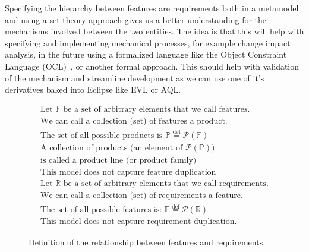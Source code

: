 Specifying the hierarchy between features are requirements both in a metamodel and using a set theory approach gives us a better understanding for the mechanisms involved between the two entities. The idea is that this will help with specifying and implementing mechanical processes, for example change impact analysis, in the future using a formalized language like the Object Constraint Language (OCL)~\cite{richters2002ocl, cabot2012object}, or another formal approach. This should help with validation of the mechanism and streamline development as we can use one of it's derivatives baked into Eclipse like \ac{EVL} or \ac{AQL}.

\begin{figure}
\begin{align}
	\text{Let } \mathbb{F} \text{ be a set of arbitrary elements that we call features.}\\
		\text{We can call a collection (set) of features a product.}\\
		\text{The set of all possible products is } \mathbb{P} \overset{\mathrm{def}}{=} \mathcal{P}(\mathbb{F})\\
		\text{A collection of products (an element of } \mathcal{P}(\mathbb{P})\text{)}\\
		\text{is called a product line (or product family)}\\
		\text{This model does not capture feature duplication}\\
		\text{Let } \mathbb{R} \text{ be a set of arbitrary elements that we call requirements.}\\
		\text{We can call a collection (set) of requirements a feature.}\\
		\text{The set of all possible features is: } \mathbb{F} \overset{\mathrm{def}}{=} \mathcal{P}(\mathbb{R})\\
		\text{This model does not capture requirement duplication.}
\end{align}
\caption{Definition of the relationship between features and requirements.}
\label{fig:spec}
\end{figure}

